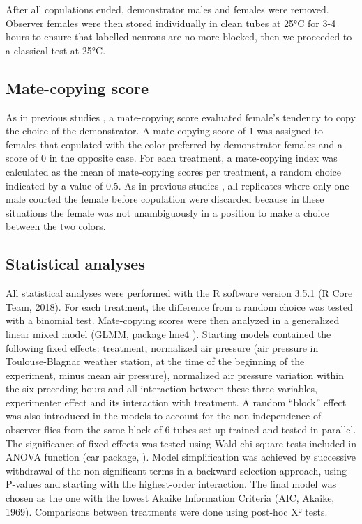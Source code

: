 \documentclass[a4paper, 12pt]{article}
\begin{document}
	After all copulations ended, demonstrator males and females were removed. Observer females were then stored individually in clean tubes at 25°C for 3-4 hours to ensure that labelled neurons are no more blocked, then we proceeded to a classical test at 25°C.


	\subsection{Mate-copying score}

	As in previous studies \parencite{dagaeff_drosophila_2016, nobel_mate-copying_2018,monier_dopamine_2018}, a mate-copying score evaluated female’s tendency to copy the choice of the demonstrator. A mate-copying score of 1 was assigned to females that copulated with the color preferred by demonstrator females and a score of 0 in the opposite case. For each treatment, a mate-copying index was calculated as the mean of mate-copying scores per treatment, a random choice indicated by a value of 0.5. As in previous studies \parencite{dagaeff_drosophila_2016, nobel_mate-copying_2018,monier_dopamine_2018}, all replicates where only one male courted the female before copulation were discarded because in these situations the female was not unambiguously in a position to make a choice between the two colors.

	\subsection{Statistical analyses}

	All statistical analyses were performed with the R software version 3.5.1 (R Core Team, 2018).
	For each treatment, the difference from a random choice was tested with a binomial test. Mate-copying scores were then analyzed in a generalized linear mixed model (GLMM, package lme4 \parencite{bates_fitting_2015}). Starting models contained the following fixed effects: treatment, normalized air pressure (air pressure in Toulouse-Blagnac weather station, at the time of the beginning of the experiment, minus mean air pressure), normalized air pressure variation within the six preceding hours and all interaction between these three variables, experimenter effect and its interaction with treatment. A random “block” effect was also introduced in the models to account for the non-independence of observer flies from the same block of 6 tubes-set up trained and tested in parallel. The significance of fixed effects was tested using Wald chi-square tests included in ANOVA function (car package, \textcite{fox_r_2018} ). Model simplification was achieved by successive withdrawal of the non-significant terms in a backward selection approach, using P-values and starting with the highest-order interaction. The final model was chosen as the one with the lowest Akaike Information Criteria (AIC, Akaike, 1969). Comparisons between treatments were done using post-hoc X² tests. 
	
\end{document}
